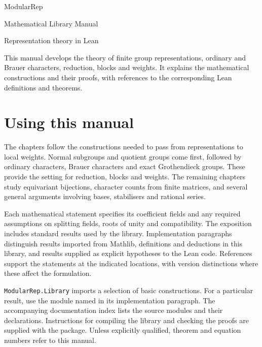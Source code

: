\documentclass[11pt,oneside]{book}
\begin{document}
\frontmatter
\begin{titlepage}
\centering
\vspace*{28mm}
{\Large\sffamily ModularRep\par}
\vspace{12mm}
{\Huge Mathematical Library Manual\par}
\vspace{10mm}
{\large Representation theory in Lean\par}
\vfill
\begin{minipage}{0.82\textwidth}
This manual develops the theory of finite group representations, ordinary
and Brauer characters, reduction, blocks and weights. It explains the mathematical
constructions and their proofs, with references to the corresponding
Lean definitions and theorems.
\end{minipage}
\vspace{18mm}
\end{titlepage}
\tableofcontents
\chapter*{Using this manual}
The chapters follow the constructions needed to pass from representations
to local weights. Normal subgroups and quotient groups come first, followed
by ordinary characters, Brauer characters and exact Grothendieck groups.
These provide the setting for reduction, blocks and weights. The remaining
chapters study equivariant bijections, character counts from finite
matrices, and several general arguments involving bases, stabilisers and
rational series.

Each mathematical statement specifies its coefficient fields and any
required assumptions on splitting fields, roots of unity and compatibility. The exposition
includes standard results used by the library. Implementation paragraphs
distinguish results imported from Mathlib, definitions and deductions in
this library, and results supplied as explicit hypotheses to the Lean code.
References support the statements at the indicated locations, with version
distinctions where these affect the formulation.

\texttt{ModularRep.Library} imports a selection of basic constructions.
For a particular result, use the module named in its implementation paragraph. The accompanying
documentation index lists the source modules and their declarations.
Instructions for compiling the library and checking the proofs are supplied
with the package.
Unless explicitly qualified, theorem and equation numbers refer to this
manual.
\end{document}
